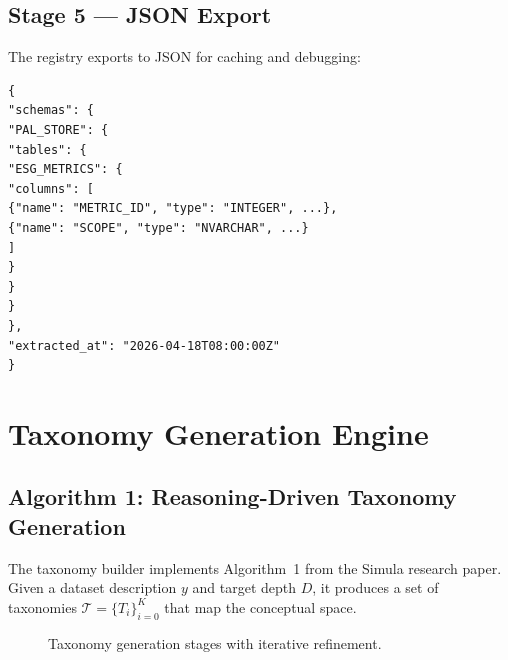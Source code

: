 \documentclass[12pt,a4paper,twoside]{report}
\begin{document}
\section{Stage 5 --- JSON Export}

The registry exports to JSON for caching and debugging:

\begin{lstlisting}[language=jsonx,caption={JSON export format}]
{
"schemas": {
"PAL_STORE": {
"tables": {
"ESG_METRICS": {
"columns": [
{"name": "METRIC_ID", "type": "INTEGER", ...},
{"name": "SCOPE", "type": "NVARCHAR", ...}
]
}
}
}
},
"extracted_at": "2026-04-18T08:00:00Z"
}
\end{lstlisting}

\newpage
\chapter{Taxonomy Generation Engine}
\label{chap:taxonomy}

\section{Algorithm 1: Reasoning-Driven Taxonomy Generation}

The taxonomy builder implements Algorithm~1 from the Simula research paper. Given a
dataset description $y$ and target depth $D$, it produces a set of taxonomies
$\mathcal{T} = \{T_i\}_{i=0}^{K}$ that map the conceptual space.

\begin{figure}[H]
\centering
{}
\caption{Taxonomy generation stages with iterative refinement.}
\label{fig:taxonomy-stages}
\end{figure}
\end{document}
